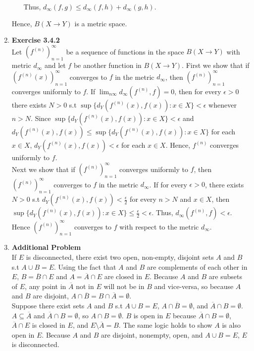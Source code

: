 \documentclass[10pt]{article}
\begin{document}
\begin{enumerate}[label=Problem \arabic*.]
\begin{itemize}
        Thus, $d_\infty(f,g)\le d_\infty(f,h)+d_\infty(g,h)$.
    \end{itemize}
    Hence, $B(X\rightarrow Y)$ is a metric space.
    \item \textbf{Exercise 3.4.2}\\
    Let $(f^{(n)})^{\infty}_{n=1}$ be a sequence of functions in the space $B(X\rightarrow Y)$ with metric $d_\infty$ and let $f$ be another function in $B(X\rightarrow Y)$. 
    First we show that if $(f^{(n)}(x))^{\infty}_{n=1}$ converges to $f$ in the metric $d_\infty$, then $(f^{(n)})^{\infty}_{n=1}$ converges uniformly to $f$. 
    If $\displaystyle{\lim_{n\infty}} d_\infty(f^{(n)},f)=0$, then for every $\epsilon>0$ there exists $N>0$ s.t $\sup\{d_Y(f^{(n)}(x),f(x)):x\in X\}<\epsilon$ whenever $n>N$. 
    Since $\sup\{d_Y(f^{(n)}(x),f(x)):x\in X\}<\epsilon$ and $d_Y(f^{(n)}(x),f(x))\le\sup\{d_Y(f^{(n)}(x),f(x)):x\in X\}$ for each $x\in X$, $d_Y(f^{(n)}(x),f(x))<\epsilon$ for each $x\in X$.
    Hence, $f^{(n)}$ converges uniformly to $f$.\\
    Next we show that if $(f^{(n)})^{\infty}_{n=1}$ converges uniformly to $f$, then $(f^{(n)})^{\infty}_{n=1}$ converges to $f$ in the metric $d_\infty$.
    If for every $\epsilon>0$, there exists $N>0$ s.t $d_Y(f^{(n)}(x),f(x))<\frac{\epsilon}{2}$ for every $n>N$ and $x\in X$, then $\sup\{d_Y(f^{(n)}(x),f(x)):x\in X\}\le \frac{\epsilon}{2}<\epsilon$. 
    Thus, $d_\infty(f^{(n)},f)<\epsilon$.
    Hence $(f^{(n)})^{\infty}_{n=1}$ converges to $f$ with respect to the metric $d_\infty$.
    \newpage
\item \textbf{Additional Problem}\\
If $E$ is disconnected, there exist two open, non-empty, disjoint sets $A$ and $B$ s.t $A\cup B=E$.
Using the fact that $A$ and $B$ are complements of each other in $E$, $B=\overline{B}\cap E$ and  $A=\overline{A}\cap E$ are closed in $E$.
Because $A$ and $B$ are subsets of $E$, any point in $\overline{A}$ not in $E$ will not be in $B$ and vice-versa, so because $A$ and $B$ are disjoint, $A\cap\overline{B}=B\cap\overline{A}=\emptyset$.\\ 
Suppose there exist sets $A$ and $B$ s.t $A\cup B=E$, $A\cap\overline{B}=\emptyset$, and $\overline{A}\cap B=\emptyset$.
$A\subseteq\overline{A}$ and $\overline{A}\cap B=\emptyset$, so $A\cap B=\emptyset$.
$B$ is open in $E$ because $\overline{A}\cap B=\emptyset$, $\overline{A}\cap E$ is closed in $E$, and $E\setminus\overline{A}=B$.
The same logic holds to show $A$ is also open in $E$.
Because $A$ and $B$ are disjoint, nonempty, open, and $A\cup B=E$, $E$ is disconnected.\\

   
   
\end{enumerate}
\end{document}
